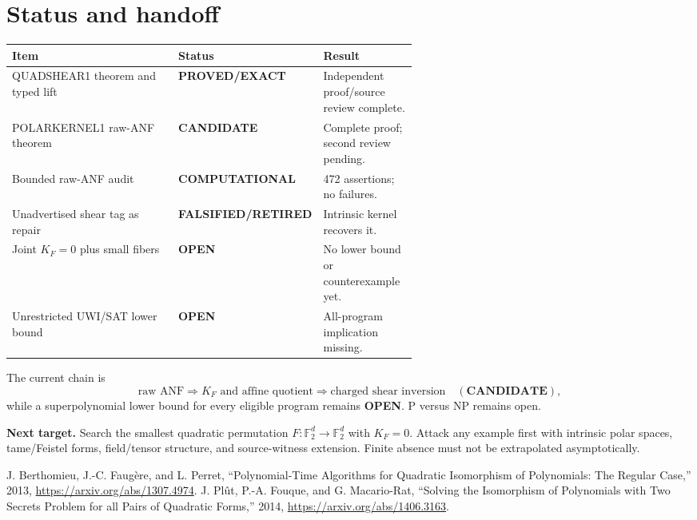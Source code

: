 \documentclass[11pt]{article}
\newcommand{\F}{\mathbb F_2}
\newcommand{\EXACT}{\textbf{PROVED/EXACT}}
\newcommand{\COMP}{\textbf{COMPUTATIONAL}}
\newcommand{\CAND}{\textbf{CANDIDATE}}
\newcommand{\OPEN}{\textbf{OPEN}}
\newcommand{\RET}{\textbf{FALSIFIED/RETIRED}}
\begin{document}
\section{Status and handoff}
\begin{tabularx}{\linewidth}{p{0.41\linewidth}p{0.18\linewidth}X}
\toprule
Item & Status & Result \\
\midrule
QUADSHEAR1 theorem and typed lift & \EXACT & Independent proof/source review complete.\\
POLARKERNEL1 raw-ANF theorem & \CAND & Complete proof; second review pending.\\
Bounded raw-ANF audit & \COMP & 472 assertions; no failures.\\
Unadvertised shear tag as repair & \RET & Intrinsic kernel recovers it.\\
Joint $K_F=0$ plus small fibers & \OPEN & No lower bound or counterexample yet.\\
Unrestricted UWI/SAT lower bound & \OPEN & All-program implication missing.\\
\bottomrule
\end{tabularx}

The current chain is
\[
 \text{raw ANF}\Longrightarrow K_F\text{ and affine quotient}
 \Longrightarrow\text{charged shear inversion}\quad(\CAND),
\]
while a superpolynomial lower bound for every eligible program remains
\OPEN{}.  P versus NP remains open.

\textbf{Next target.}  Search the smallest quadratic permutation
$F:\F^d\to\F^d$ with $K_F=0$.  Attack any example first with intrinsic polar
spaces, tame/Feistel forms, field/tensor structure, and source-witness
extension.  Finite absence must not be extrapolated asymptotically.

\begin{thebibliography}{9}
 J. Berthomieu, J.-C. Faug\`ere, and L. Perret,
``Polynomial-Time Algorithms for Quadratic Isomorphism of Polynomials: The
Regular Case,'' 2013, \url{https://arxiv.org/abs/1307.4974}.
 J. Pl\^ut, P.-A. Fouque, and G. Macario-Rat,
``Solving the Isomorphism of Polynomials with Two Secrets Problem for all
Pairs of Quadratic Forms,'' 2014, \url{https://arxiv.org/abs/1406.3163}.
\end{thebibliography}
\end{document}
